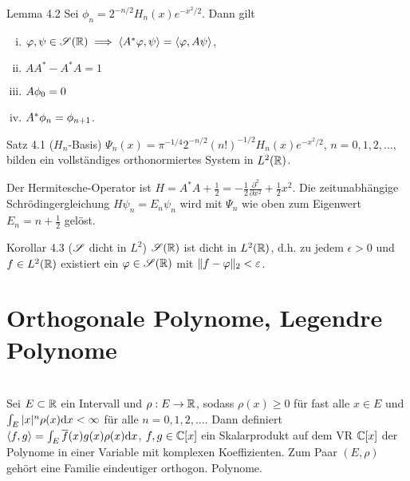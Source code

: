 \begin{namedtheorem}{Lemma 4.2}
  Sei $\phi_n = 2^{-n/2}H_n(x)e^{-x^2/2}$. Dann gilt
  \begin{enumerate}[(i)]
    \item $\varphi,\psi\in\mathscr{S}(\mathbb{R}) \implies \langle A^{\ast}\varphi,\psi \rangle = \langle \varphi,A\psi \rangle$,
  \end{enumerate}
  {\setlength\multicolsep{4pt}%
  \begin{multicols}{3}
  \begin{enumerate}[(i)]
    \setcounter{enumi}{1}
    \item $AA^{\ast} - A^{\ast}A = 1$
    \item $A\oldphi_0=0$
    \item $A^{\ast}\oldphi_n = \oldphi_{n+1}$.
  \end{enumerate}
  \end{multicols}}
\end{namedtheorem}

\begin{namedtheorem}{Satz 4.1 ($H_n$-Basis)}
  $\Psi_n(x) = \pi^{-1/4}2^{-n/2}(n!)^{-1/2}H_n(x)e^{-x^2/2}$, $n=0,1,2,\ldots$, bilden ein vollständiges orthonormiertes System in $L^2(\mathbb{R})$.
\end{namedtheorem}

Der Hermitesche-Operator ist $H=A^{\ast}A+\frac12 = -\frac12\frac{\partial^2}{\partial x^2} + \frac12x^2$. Die zeitunabhängige Schrödingergleichung $H\psi_n=E_n\psi_n$ wird mit $\Psi_n$ wie oben zum Eigenwert $E_n=n+\frac12$ gelöst.

\begin{namedtheorem}{Korollar 4.3 ($\mathscr{S}$ dicht in $L^2$)}
  $\mathscr{S}(\mathbb{R})$ ist dicht in $L^2(\mathbb{R})$, d.h. zu jedem $\epsilon>0$ und $f\in L^2(\mathbb{R})$ existiert ein $\varphi\in\mathscr{S}(\mathbb{R})$ mit $\lVert f-\varphi\rVert_2<\varepsilon$. 
\end{namedtheorem}

\section{Orthogonale Polynome, Legendre Polynome}
\hspace*{\fill} \\
Sei $E\subset\mathbb{R}$ ein Intervall und $\rho:E\rightarrow\mathbb{R}$, sodass $\rho(x)\geq0$ für fast alle $x\in E$ und $\int_E |x|^n \rho(x)\mathrm{d} x < \infty$ für alle $n=0,1,2,\ldots$. Dann definiert $\langle f,g \rangle=\int_E\overline{f}(x)g(x)\rho(x)\mathrm{d} x$, $f,g\in\mathbb{C}[x]$ ein Skalarprodukt auf dem VR $\mathbb{C}[x]$ der Polynome in einer Variable mit komplexen Koeffizienten. Zum Paar $(E,\rho)$ gehört eine Familie eindeutiger orthogon. Polynome.

